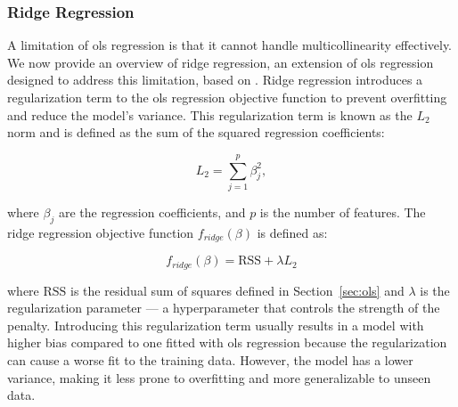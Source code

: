 \subsubsection{Ridge Regression}
A limitation of \gls{ols} regression is that it cannot handle multicollinearity effectively.
We now provide an overview of ridge regression, an extension of \gls{ols} regression designed to address this limitation, based on \citet{James2023AnIS}.
Ridge regression introduces a regularization term to the \gls{ols} regression objective function to prevent overfitting and reduce the model's variance.
This regularization term is known as the $L_2$ norm and is defined as the sum of the squared regression coefficients:

$$
L_2 = \sum_{j=1}^{p} \beta_j^2,
$$

where $\beta_j$ are the regression coefficients, and $p$ is the number of features.
The ridge regression objective function $f_{ridge}(\beta)$ is defined as:

$$
f_{ridge}(\beta) = \text{RSS} + \lambda L_2
$$

where $\text{RSS}$ is the residual sum of squares defined in Section~\ref{sec:ols} and $\lambda$ is the regularization parameter --- a hyperparameter that controls the strength of the penalty.
Introducing this regularization term usually results in a model with higher bias compared to one fitted with \gls{ols} regression because the regularization can cause a worse fit to the training data.
However, the model has a lower variance, making it less prone to overfitting and more generalizable to unseen data.